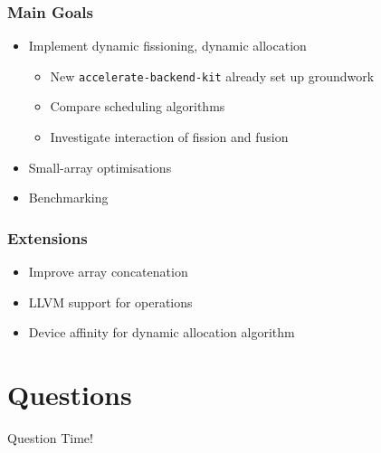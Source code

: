 \documentclass{beamer}
\begin{document}
\begin{frame}
\frametitle{Main Goals}
\begin{itemize}
  \item Implement dynamic fissioning, dynamic allocation
    \begin{itemize}
      \item New \texttt{accelerate-backend-kit} already set up groundwork
      \item Compare scheduling algorithms
      \item Investigate interaction of fission and fusion
    \end{itemize}
  \item Small-array optimisations
  \item Benchmarking
\end{itemize}
\end{frame}

\begin{frame}
\frametitle{Extensions}
\begin{itemize}
  \item Improve array concatenation
  \item LLVM support for operations
  \item Device affinity for dynamic allocation algorithm
\end{itemize}
\end{frame}

\section{Questions}

\begin{frame}
\Huge{\centerline{Question Time!}}
\end{frame}

\end{document}
